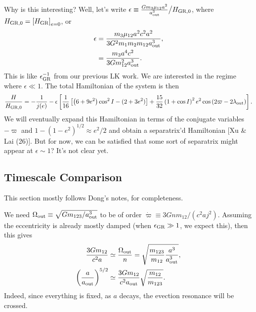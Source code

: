 \documentclass[10pt,
        usenames, %
        dvipsnames %
    ]{article}
\newcommand*{\p}[1]{\left(#1\right)}
\newcommand*{\s}[1]{\left[#1\right]}
\begin{document}
Why is this interesting? Well, let's write $\epsilon \equiv
\frac{Gm_3\mu_{12}a^2}{a_{\rm out}^3} \big/ H_{\rm GR, 0}$, where $H_{\rm GR, 0}
= \s{H_{\rm GR}}_{e = 0}$, or
\begin{align}
    \epsilon &= \frac{m_3\mu_{12}a^2 c^2a^2}{3G^2m_1m_2m_{12}a_{\rm out}^3},\\
        &= \frac{m_3a^4 c^2}{3Gm_{12}^2a_{\rm out}^3}.
\end{align}
This is like $\epsilon_{\rm GR}^{-1}$ from our previous LK work. We are
interested in the regime where $\epsilon \ll 1$. The total Hamiltonian of the
system is then
\begin{equation}
    \frac{H}{H_{\rm GR, 0}} = -\frac{1}{j(e)}
        - \epsilon\s{
        \frac{1}{16}\s{\p{6 + 9e^2}\cos^2 I
            - (2 + 3e^2)} + \frac{15}{32}
                \p{1 + \cos I}^2 e^2 \cos\p{2\varpi - 2\lambda_{\rm out}}}.
\end{equation}
We will eventually expand this Hamiltonian in terms of the conjugate variables
$-\varpi$ and $1 - \p{1 - e^2}^{1/2} \approx e^2/2$ and obtain a separatrix'd
Hamiltonian [Xu \& Lai (26)]. But for now, we can be satisfied that some sort of
separatrix might appear at $\epsilon \sim 1$? It's not clear yet.

\subsection{Timescale Comparison}

This section mostly follows Dong's notes, for completeness.

We need $\Omega_{\rm out} \equiv \sqrt{Gm_{123} / a_{\rm out}^3}$ to be of order
$\dot{\varpi} \equiv 3Gnm_{12} / (c^2aj^2)$. Assuming the eccentricity is
already mostly damped (when $\epsilon_{\rm GR} \gg 1$, we expect this), then
this gives
\begin{align}
    \frac{3Gm_{12}}{c^2a} &\simeq \frac{\Omega_{\rm out}}{n}
        = \sqrt{\frac{m_{123}}{m_{12}}\frac{a^3}{a_{\rm out}^3}},\\
    \p{\frac{a}{a_{\rm out}}}^{5/2} &\simeq
        \frac{3Gm_{12}}{c^2a_{\rm out}}\sqrt{\frac{m_{12}}{m_{123}}}.
\end{align}
Indeed, since everything is fixed, as $a$ decays, the evection resonance will be
crossed.
\end{document}
